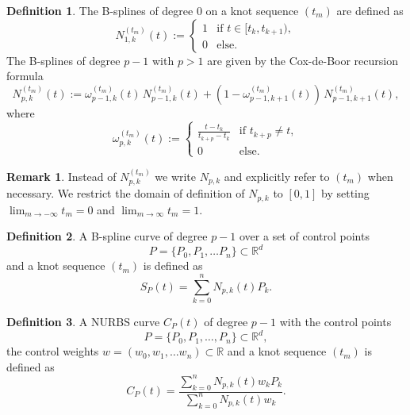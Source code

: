 \documentclass[a4paper, 11pt]{report}
\theoremstyle{definition}
\newtheorem{definition}{Definition}[section]
\newtheorem*{remark}{Remark}
\begin{document}
	\begin{definition}
		The B-splines of degree $0$ on a knot sequence $(t_m)$ are defined as
		\begin{equation}\label{eq:coxdeboor0}
			N^{(t_m)}_{1,k}(t) :=
			\begin{cases}
				1 & \text{if } t \in [t_k, t_{k+1}),\\
				0 & \text{else.}
			\end{cases}
		\end{equation}
		The B-splines of degree $p-1$ with $p > 1$ are given by the Cox-de-Boor recursion formula
		\begin{equation}\label{eq:coxdeboorp}
			N_{p,k}^{(t_m)}(t) := \omega^{(t_m)}_{p-1, k}(t) \, N^{(t_m)}_{p-1, k}(t) + (1-\omega^{(t_m)}_{p-1, k+1}(t)) \, N^{(t_m)}_{p-1, k+1}(t),
		\end{equation}
		where
		\begin{equation*}
			\omega^{(t_m)}_{p,k}(t) := 
			\begin{cases}
				\frac{t-t_k}{t_{k+p} - t_k} &\text{if } t_{k+p} \neq t,\\
				0 							&\text{else.}
			\end{cases}
		\end{equation*}
	\end{definition}

	\begin{remark}
		Instead of $N_{p,k}^{(t_m)}$ we write $N_{p,k}$ and explicitly refer to $(t_m)$ when necessary. We restrict the domain of definition of $N_{p,k}$ to $[0, 1]$ by setting $\lim_{m \to -\infty} t_m = 0$ and $\lim_{m \to \infty} t_m = 1$.
	\end{remark}

	\begin{definition}
		A B-spline curve of degree $p-1$ over a set of control points
			$$P = \{P_0, P_1, \ldots P_n\} \subset \mathbb{R}^d$$
		and a knot sequence $(t_m)$ is defined as
			$$ S_P(t) = \sum_{k=0}^{n} N_{p,k}(t) P_k.$$
	\end{definition}

	\begin{definition}\label{def:nurbs}
		A NURBS curve $C_P(t)$ of degree $p-1$ with the control points 
			$$P = \{P_0, P_1, \ldots, P_n\} \subset \mathbb{R}^d,$$ 
		the control weights $w = (w_0, w_1, \ldots w_n) \subset \mathbb{R}$ and a knot sequence $(t_m)$ is defined as
		\begin{equation}
			C_P(t) = \frac{\sum_{k=0}^n N_{p,k}(t) w_k P_k}{\sum_{k=0}^n N_{p,k}(t) w_k}.
		\end{equation}
	\end{definition}
\end{document}
